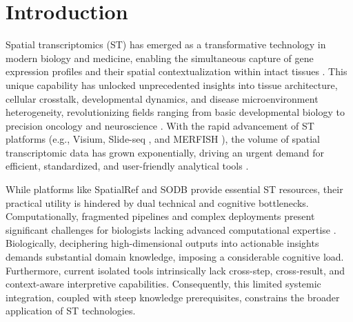 \documentclass[a4,center,fleqn]{NAR}
\begin{document}
\section{Introduction}
Spatial transcriptomics (ST) has emerged as a transformative technology in modern biology and medicine, enabling the simultaneous capture of gene expression profiles and their spatial contextualization within intact tissues \cite{rao2021exploring,marx2021method}. This unique capability has unlocked unprecedented insights into tissue architecture, cellular crosstalk, developmental dynamics, and disease microenvironment heterogeneity, revolutionizing fields ranging from basic developmental biology to precision oncology and neuroscience \cite{maynard2021transcriptome,xia2025deciphering}. With the rapid advancement of ST platforms (e.g., Visium, Slide-seq \cite{rodriques2019slide}, and MERFISH \cite{chen2015spatially}), the volume of spatial transcriptomic data has grown exponentially, driving an urgent demand for efficient, standardized, and user-friendly analytical tools \cite{moses2022museum}.

While platforms like SpatialRef \cite{cui2025spatialref} and SODB \cite{yuan2023sodb} provide essential ST resources, their practical utility is hindered by dual technical and cognitive bottlenecks. Computationally, fragmented pipelines and complex deployments present significant challenges for biologists lacking advanced computational expertise \cite{fang2023computational,dries2021giotto,palla2022squidpy}. Biologically, deciphering high-dimensional outputs into actionable insights demands substantial domain knowledge, imposing a considerable cognitive load. Furthermore, current isolated tools intrinsically lack cross-step, cross-result, and context-aware interpretive capabilities. Consequently, this limited systemic integration, coupled with steep knowledge prerequisites, constrains the broader application of ST technologies. 
\end{document}
